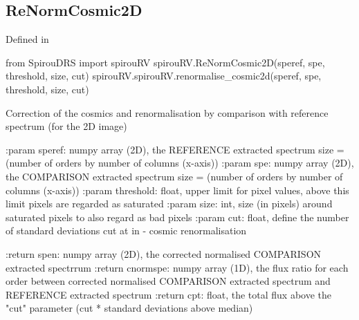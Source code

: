 \begin{minipage}{\textwidth}
\subsection{ReNormCosmic2D}

Defined in \spirouRV{}

\begin{pythonbox}
from SpirouDRS import spirouRV
spirouRV.ReNormCosmic2D(speref, spe, threshold, size, cut)
spirouRV.spirouRV.renormalise_cosmic2d(speref, spe, threshold, size, cut)
\end{pythonbox}

\begin{pythondocstring}
Correction of the cosmics and renormalisation by comparison with
reference spectrum (for the 2D image)

:param speref: numpy array (2D), the REFERENCE extracted spectrum
               size = (number of orders by number of columns (x-axis))
:param spe:  numpy array (2D), the COMPARISON extracted spectrum
             size = (number of orders by number of columns (x-axis))
:param threshold: float, upper limit for pixel values, above this limit
                  pixels are regarded as saturated
:param size: int, size (in pixels) around saturated pixels to also regard
             as bad pixels
:param cut: float, define the number of standard deviations cut at in             -                  cosmic renormalisation

:return spen: numpy array (2D), the corrected normalised COMPARISON
              extracted spectrrum
:return cnormspe: numpy array (1D), the flux ratio for each order between
                  corrected normalised COMPARISON extracted spectrum and
                  REFERENCE extracted spectrum
:return cpt: float, the total flux above the "cut" parameter
             (cut * standard deviations above median)
\end{pythondocstring}
\end{minipage}



